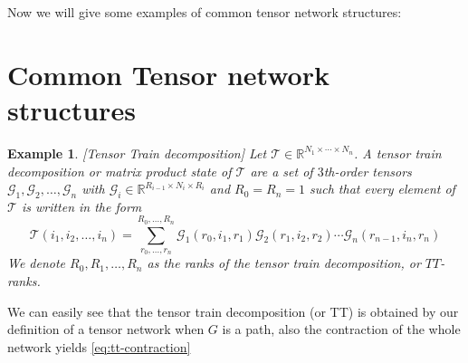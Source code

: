 \documentclass[11pt,a4paper,openright,oneside]{book}
\numberwithin{equation}{section}
\newtheorem{example0}[defn0]{Example}
\newenvironment{example}{ \begin{example0}\rm}{\end{example0}}
\newcommand{\refeq}[1]{\cref{#1}}
\begin{document}
Now we will give some examples of common tensor network structures:


\section{Common Tensor network structures}

\begin{example}[Tensor Train decomposition]
     Let $\mathcal{T} \in \mathbb{R}^{N_1 \times \cdots \times N_n}$. A tensor
train decomposition or matrix product state of $\mathcal{T}$ are a set of $3$th-order tensors $\mathcal{G}_1,\mathcal{G}_2,\dots,\mathcal{G}_n$ with
    $\mathcal{G}_i \in \mathbb{R}^{R_{i-1} \times N_i \times R_i}$ and $R_0 = R_n = 1$ such that every element of $\mathcal{T}$ is written in the
    form
    \begin{equation} \label{eq:tt-contraction}
    \mathcal{T}(i_1,i_2,\dots,i_n) = \sum_{r_0, \dots, r_n}^{R_0, \dots, R_n} \mathcal{G}_1(r_0, i_1, r_1) \mathcal{G}_2 (r_1, i_2, r_2) \cdots \mathcal{G}_n(r_{n-1}, i_n, r_n)
\end{equation}
We denote $R_0, R_1, \dots, R_n$ as the ranks of the tensor train decomposition, or $TT$-ranks.
\end{example}

We can easily see that the tensor train decomposition (or TT) is obtained by our definition of a tensor network when $G$ is a path, also
the contraction of the whole network yields \refeq{eq:tt-contraction}
\end{document}
